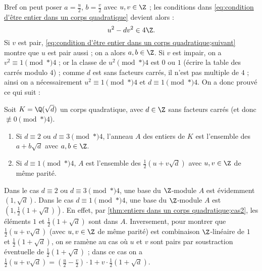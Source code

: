 \documentclass[11pt, %
  title in boldface,
  theorem in new line,
  theorem numbering = section,
  number theorems separately,
  simple name,
]{beaulivre}
\begin{document}
    Bref on peut poser \( a = \frac{u}{2} \), \( b = \frac{v}{2} \) avec \( u,v \in \Z \) ; les conditions dans \eqref{eq:condition d'être entier dans un corps quadratique} devient alors :
    \begin{equation}\label{eq:condition d'être entier dans un corps quadratique;suivant}
        u^2 - d v^2 \in 4\Z.
    \end{equation}
    Si \( v \) est pair, \eqref{eq:condition d'être entier dans un corps quadratique;suivant} montre que \( u \) est pair aussi ; on a alors \( a, b \in \Z \). Si \( v \) est impair, on a \( v^2 \equiv 1 \pmod*{4} \) ; or la classe de \( u^2 \pmod*{4} \) est \( 0 \) ou \( 1 \) (écrire la table des carrés modulo \( 4 \)) ; comme \( d \) est sans facteurs carrés, il n'est pas multiple de \( 4 \) ; ainsi on a nécessairement \( u^2 \equiv 1 \pmod*{4} \) et \( d \equiv 1 \pmod*{4} \). On a donc prouvé ce qui suit :
    \begin{theorem}\label{thm:entiers dans un corps quadratique}
        Soit \( K = \Q(\sqrt{d}) \) un corps quadratique, avec \( d \in \Z \) sans facteurs carrés (et donc \( \not\equiv 0 \pmod*{4} \)).
        \begin{enumerate}
            \item \label{thm:entiers dans un corps quadratique;cas1} Si \( d \equiv 2 \) ou \( d \equiv 3 \pmod*{4} \), l'anneau \( A \) des entiers de \( K \) est l'ensemble des \( a+b\sqrt{d} \) avec \( a,b \in \Z \).
            \item \label{thm:entiers dans un corps quadratique;cas2} Si \( d \equiv 1 \pmod*{4} \), \( A \) est l'ensemble des \( \frac{1}{2}(u+v\sqrt{d}) \) avec \( u,v \in \Z \) de même parité.
        \end{enumerate}
    \end{theorem}

    Dans le cas \( d \equiv 2 \) ou \( d \equiv 3 \pmod*{4} \), une base du \( \Z \)‑module \( A \) est évidemment \( (1,\sqrt{d}) \). Dans le cas \( d \equiv 1 \pmod*{4} \), une base du \( \Z \)‑module \( A \) est \( \left(1, \frac{1}{2}(1+\sqrt{d})\right) \). En effet, par \ref{thm:entiers dans un corps quadratique;cas2}, les éléments \( 1 \) et \( \frac{1}{2}(1+\sqrt{d}) \) sont dans \( A \). Inversement, pour montrer que \( \frac{1}{2}(u+v\sqrt{d}) \) (avec \( u,v \in \Z \) de même parité) est combinaison \( \Z \)‑linéaire de \( 1 \) et \( \frac{1}{2}(1+\sqrt{d}) \), on se ramène au cas où \( u \) et \( v \) sont pairs par soustraction éventuelle de \( \frac{1}{2}(1+\sqrt{d}) \) ; dans ce cas on a \( \frac{1}{2}(u+v\sqrt{d}) = \left(\frac{u}{2}-\frac{v}{2}\right) \cdot 1 + v \cdot \frac{1}{2}(1+\sqrt{d}) \).
\end{document}
